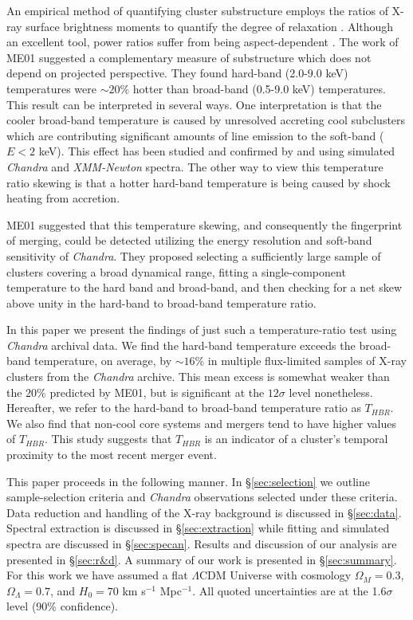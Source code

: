 \documentclass{emulateapj}
\begin{document}
An empirical method of quantifying cluster substructure employs the ratios of
X-ray surface brightness moments to quantify the degree of relaxation
\citep{1995ApJ...452..522B, 1996ApJ...458...27B,
2005ApJ...624..606J}. Although an excellent tool, power ratios suffer
from being aspect-dependent \citep{2007arXiv0708.1518J, VV08}. The
work of ME01 suggested a complementary measure of substructure which
does not depend on projected perspective. They found hard-band
(2.0-9.0 keV) temperatures were $\sim 20\%$ hotter than broad-band
(0.5-9.0 keV) temperatures. This result can be interpreted in several
ways. One interpretation is that the cooler broad-band temperature is
caused by unresolved accreting cool subclusters which are contributing
significant amounts of line emission to the soft-band ($E < 2$
keV). This effect has been studied and confirmed by
\cite{2004MNRAS.354...10M} and \cite{2006ApJ...640..710V} using
simulated {\it Chandra} and {\textit{XMM-Newton}} spectra. The other
way to view this temperature ratio skewing is that a hotter hard-band
temperature is being caused by shock heating from accretion.

ME01 suggested that this temperature skewing, and consequently the
fingerprint of merging, could be detected utilizing the energy
resolution and soft-band sensitivity of {\it Chandra}. They proposed
selecting a sufficiently large sample of clusters covering a broad
dynamical range, fitting a single-component temperature to the hard
band and broad-band, and then checking for a net skew above unity in
the hard-band to broad-band temperature ratio.

In this paper we present the findings of just such a temperature-ratio
test using {\it Chandra} archival data. We find the hard-band
temperature exceeds the broad-band temperature, on average, by
$\sim16\%$ in multiple flux-limited samples of X-ray clusters from the
{\it Chandra} archive. This mean excess is somewhat weaker than the
$20\%$ predicted by ME01, but is significant at the $12\sigma$ level
nonetheless. Hereafter, we refer to the hard-band to broad-band
temperature ratio as $T_{HBR}$. We also find that non-cool core
systems and mergers tend to have higher values of $T_{HBR}$. This
study suggests that $T_{HBR}$ is an indicator of a cluster's temporal
proximity to the most recent merger event.

This paper proceeds in the following manner. In \S\ref{sec:selection}
we outline sample-selection criteria and {\it Chandra}
observations selected under these criteria. Data reduction and
handling of the X-ray background is discussed in
\S\ref{sec:data}. Spectral extraction is discussed in
\S\ref{sec:extraction} while fitting and simulated spectra are
discussed in \S\ref{sec:specan}. Results and discussion of our
analysis are presented in \S\ref{sec:r&d}. A summary of our work
is presented in \S\ref{sec:summary}. For this work we have assumed a
flat $\Lambda$CDM Universe with cosmology $\Omega_{M} = 0.3$,
$\Omega_{\Lambda} = 0.7$, and $H_{0} = 70$ km s$^{-1}$ Mpc$^{-1}$. All
quoted uncertainties are at the 1.6$\sigma$ level (90\% confidence).
\end{document}
